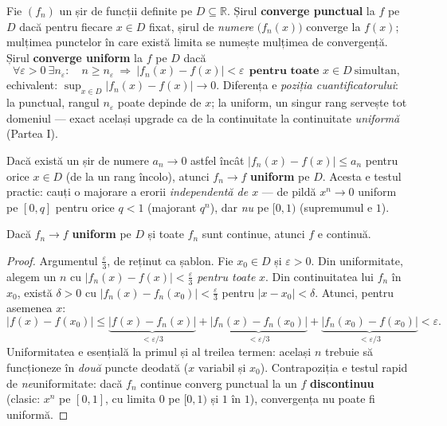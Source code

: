 \begin{definitie}
Fie $(f_n)$ un șir de funcții definite pe $D\subseteq\mathbb{R}$. Șirul \textbf{converge punctual} la $f$ pe $D$ dacă pentru fiecare $x\in D$ fixat, șirul de \emph{numere} $\big(f_n(x)\big)$ converge la $f(x)$; mulțimea punctelor în care există limita se numește mulțimea de convergență. Șirul \textbf{converge uniform} la $f$ pe $D$ dacă
\[
\forall\varepsilon>0\ \exists n_\varepsilon:\quad n\ge n_\varepsilon\ \Rightarrow\ |f_n(x)-f(x)|<\varepsilon\ \ \textbf{pentru toate }x\in D\ \text{simultan},
\]
echivalent: $\displaystyle\sup_{x\in D}|f_n(x)-f(x)|\to0$. Diferența e \emph{poziția cuantificatorului}: la punctual, rangul $n_\varepsilon$ poate depinde de $x$; la uniform, un singur rang servește tot domeniul --- exact același upgrade ca de la continuitate la continuitate \emph{uniformă} (Partea I).
\end{definitie}

\begin{teorema}
Dacă există un șir de numere $a_n\to0$ astfel încât $|f_n(x)-f(x)|\le a_n$ pentru orice $x\in D$ (de la un rang încolo), atunci $f_n\to f$ \textbf{uniform} pe $D$. Acesta e testul practic: cauți o majorare a erorii \emph{independentă de $x$} --- de pildă $x^n\to0$ uniform pe $[0,q]$ pentru orice $q<1$ (majorant $q^n$), dar \emph{nu} pe $[0,1)$ (supremumul e $1$).
\end{teorema}

\begin{teorema}
Dacă $f_n\to f$ \textbf{uniform} pe $D$ și toate $f_n$ sunt continue, atunci $f$ e continuă.
\end{teorema}
\begin{proof}
Argumentul $\frac\varepsilon3$, de reținut ca șablon. Fie $x_0\in D$ și $\varepsilon>0$. Din uniformitate, alegem un $n$ cu $|f_n(x)-f(x)|<\frac\varepsilon3$ \emph{pentru toate} $x$. Din continuitatea lui $f_n$ în $x_0$, există $\delta>0$ cu $|f_n(x)-f_n(x_0)|<\frac\varepsilon3$ pentru $|x-x_0|<\delta$. Atunci, pentru asemenea $x$:
\[
|f(x)-f(x_0)|\le\underbrace{|f(x)-f_n(x)|}_{<\varepsilon/3}+\underbrace{|f_n(x)-f_n(x_0)|}_{<\varepsilon/3}+\underbrace{|f_n(x_0)-f(x_0)|}_{<\varepsilon/3}<\varepsilon.
\]
Uniformitatea e esențială la primul și al treilea termen: același $n$ trebuie să funcționeze în \emph{două} puncte deodată ($x$ variabil și $x_0$). Contrapoziția e testul rapid de \emph{ne}uniformitate: dacă $f_n$ continue converg punctual la un $f$ \textbf{discontinuu} (clasic: $x^n$ pe $[0,1]$, cu limita $0$ pe $[0,1)$ și $1$ în $1$), convergența nu poate fi uniformă.
\end{proof}

